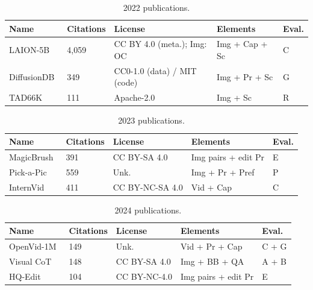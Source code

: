 ﻿\documentclass[11pt,a4paper]{article}
\begin{document}
\begin{table}[H]
\centering
\caption{2022 publications.}
\begin{tabular}{p{2.5cm}p{1.65cm}p{3.05cm}p{3.2cm}p{2.15cm}}
\hline
\textbf{Name} & \textbf{Citations} & \textbf{License} & \textbf{Elements} & \textbf{Eval.}\\
\hline
LAION-5B~\cite{schuhmann2022laion5b} & 4,059 & CC BY 4.0 (meta.); Img: OC & Img + Cap + Sc & C\\
\hline
DiffusionDB~\cite{wang2022diffusiondb} & 349 & CC0-1.0 (data) / MIT (code) & Img + Pr + Sc & G\\
\hline
TAD66K~\cite{he2022tad66k} & 111 & Apache-2.0 & Img + Sc & R\\
\hline

\end{tabular}
\end{table}

\begin{table}[H]
\centering
\caption{2023 publications.}
\begin{tabular}{p{2.5cm}p{1.65cm}p{3.05cm}p{3.2cm}p{2.15cm}}
\hline
\textbf{Name} & \textbf{Citations} & \textbf{License} & \textbf{Elements} & \textbf{Eval.}\\
\hline
MagicBrush~\cite{zhang2023magicbrush} & 391 & CC BY-SA 4.0 & Img pairs + edit Pr & E\\
\hline
Pick-a-Pic~\cite{kirstain2023pickapic} & 559 & Unk. & Img + Pr + Pref & P\\
\hline
InternVid~\cite{wang2023internvid} & 411 & CC BY-NC-SA 4.0 & Vid + Cap & C\\
\hline

\end{tabular}
\end{table}

\begin{table}[H]
\centering
\caption{2024 publications.}
\begin{tabular}{p{2.5cm}p{1.65cm}p{3.05cm}p{3.2cm}p{2.15cm}}
\hline
\textbf{Name} & \textbf{Citations} & \textbf{License} & \textbf{Elements} & \textbf{Eval.}\\
\hline
OpenVid-1M~\cite{nan2024openvid} & 149 & Unk. & Vid + Pr + Cap & C + G\\
\hline
Visual CoT~\cite{shao2024visualcot} & 148 & CC BY-SA 4.0 & Img + BB + QA & A + B\\
\hline
HQ-Edit~\cite{hui2024hqedit} & 104 & CC BY-NC-4.0 & Img pairs + edit Pr & E\\
\hline

\end{tabular}
\end{table}
\end{document}
